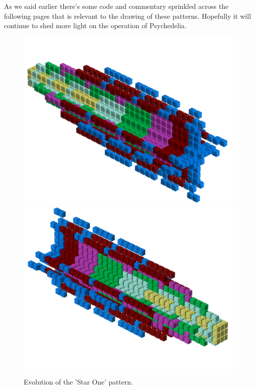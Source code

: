 As we said earlier there's some code and commentary sprinkled across the following pages that is relevant to the drawing
of these patterns. Hopefully it will continue to shed more light on the operation of Psychedelia.

\clearpage
\begin{figure}[H]
    \centering
    \begin{adjustbox}{width=12cm,center}
      \includegraphics[width=12cm]{src/patterns/pattern0-45.png}%
    \end{adjustbox}
    \begin{adjustbox}{width=12cm,margin=0cm -2cm}
      \includegraphics[width=12cm]{src/patterns/pattern0-225.png}%
    \end{adjustbox}
\caption{Evolution of the 'Star One' pattern.}
\end{figure}

